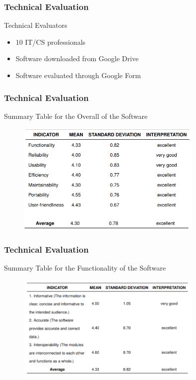 \documentclass[handout]{beamer}
\begin{document}
\begin{frame}
	\frametitle{Technical Evaluation}
	\begin{block}{Technical Evaluators}
		\begin{itemize}
			\item<1-> 10 IT/CS professionals
			\item<2-> Software downloaded from Google Drive
			\item<3-> Software evaluated through Google Form
		\end{itemize}
	\end{block}
\end{frame}

\begin{frame}
	\frametitle{Technical Evaluation}
	\begin{block}{Summary Table for the Overall of the Software}
		\begin{figure}
			\includegraphics[width=0.8\textwidth]{figures/res_tech_overall.png}
		\end{figure}
	\end{block}
\end{frame}

\begin{frame}
	\frametitle{Technical Evaluation}
	\begin{block}{Summary Table for the Functionality of the Software}
		\begin{figure}
			\includegraphics[width=0.8\textwidth]{figures/res_tech_functionality.png}
		\end{figure}
	\end{block}
\end{frame}
\end{document}
